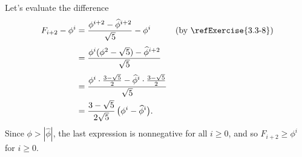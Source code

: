 Let's evaluate the difference
\begin{align*}
    F_{i+2}-\phi^i &= \frac{\phi^{i+2}-\widehat\phi^{i+2}}{\sqrt{5}}-\phi^i && \text{(by \refExercise{3.3-8})} \\[1mm]
    &= \frac{\phi^i(\phi^2-\sqrt{5})-\widehat\phi^{i+2}}{\sqrt{5}} \\[1mm]
    &= \frac{\phi^i\cdot\frac{3-\sqrt{5}}{2}-\widehat\phi^i\cdot\frac{3-\sqrt{5}}{2}}{\sqrt{5}} \\
    &= \frac{3-\sqrt{5}}{2\sqrt{5}}\,\bigl(\phi^i-\widehat\phi^i\bigr).
\end{align*}
Since $\phi>|\widehat\phi|$, the last expression is nonnegative for all $i\ge0$, and so $F_{i+2}\ge\phi^i$ for $i\ge0$.
